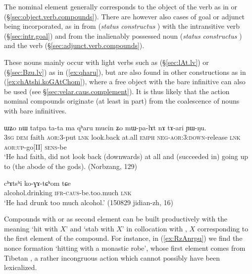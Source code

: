 The nominal element generally corresponds to the object of the verb as in  or  (§\ref{sec:object.verb.compounds}). There are however also cases of goal or adjunct being incorporated, as in  from  (\textit{status constructus} ) with the intransitive verb  (§\ref{sec:intr.goal}) and  from the inalienably possessed noun  (\textit{status constructus} ) and the verb  (§\ref{sec:adjunct.verb.compounds}).

These nouns mainly occur with light verbs such as  (§\ref{sec:lAt.lv}) or   (§\ref{sec:Bzu.lv})  as in  (\ref{ex:qharu}), but are also found in other constructions as in (\ref{ex:chAtshi.koGAtChom}), where a free object  with the bare infinitive  can also be used (see §\ref{sec:velar.caus.complement}). It is thus likely that the action nominal compounds originate (at least in part) from the coalescence of nouns with bare infinitives.

\begin{exe}
\ex \label{ex:qharu}
\gll ɯʑo nɯ  tatpa ta-ta ma qʰaru mucin ʑo mɯ-pa-lɤt nɤ tɤ-ari ɲɯ-ŋu. \\
\textsc{3sg} \textsc{dem} faith \textsc{aor}:3\flobv{}-put \textsc{lnk} look.back at.all \textsc{emph} \textsc{neg}-\textsc{aor}:3\flobv{}:\textsc{down}-release \textsc{lnk} \textsc{aor}:\textsc{up}-go[II] \textsc{sens}-be \\
\glt `He had faith, did not look back (downwards) at all and (succeeded in) going up to (the abode of the gods). (Norbzang, 129)
\end{exe}

\begin{exe}
\ex \label{ex:chAtshi.koGAtChom}
 \gll cʰɤtsʰi ko-ɣɤ-tɕʰom tɕe  \\
 alcohol.drinking \textsc{ifr}-\textsc{caus}-be.too.much \textsc{lnk} \\
\glt `He had drunk too much alcohol.' (150829 jidian-zh, 16)
\end{exe}

Compounds with  or  as second element can be built productively with the meaning `hit with $X$' and `stab with $X$' in collocation with , $X$ corresponding to the first element of the compound. For instance, in (\ref{ex:RzAnrpu}) we find the nonce formation  `hitting with a monastic robe', whose first element  comes from Tibetan , a rather incongruous action which cannot possibly have been lexicalized.
 
